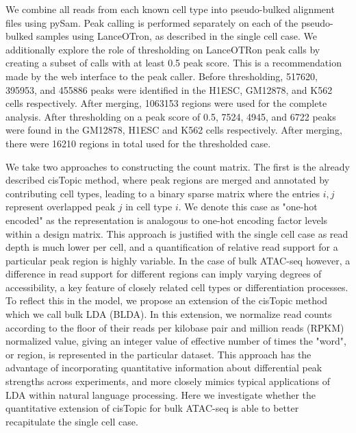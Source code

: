 We combine all reads from each known cell type into pseudo-bulked alignment files using pySam. Peak calling is performed separately on each of the pseudo-bulked samples using LanceOTron, as described in the single cell case. We additionally explore the role of thresholding on LanceOTRon peak calls by creating a subset of calls with at least 0.5 peak score. This is a recommendation made by the web interface to the peak caller. Before thresholding, 517620, 395953, and 455886 peaks were identified in the H1ESC, GM12878, and K562 cells respectively. After merging, 1063153 regions were used for the complete analysis. After thresholding on a peak score of 0.5, 7524, 4945, and 6722 peaks were found in the GM12878, H1ESC and K562 cells respectively. After merging, there were 16210 regions in total used for the thresholded case. 

We take two approaches to constructing the count matrix. The first is the already described cisTopic method, where peak regions are merged and annotated by contributing cell types, leading to a binary sparse matrix where the entries $i, j$ represent overlapped peak $j$ in cell type $i$. We denote this case as "one-hot encoded" as the representation is analogous to one-hot encoding factor levels within a design matrix. This approach is justified with the single cell case as read depth is much lower per cell, and a quantification of relative read support for a particular peak region is highly variable. In the case of bulk ATAC-seq however, a difference in read support for different regions can imply varying degrees of accessibility, a key feature of closely related cell types or differentiation processes.   To reflect this in the model, we propose an extension of the cisTopic method which we call bulk LDA (BLDA). In this extension, we normalize read counts according to the floor of their reads per kilobase pair and million reads (RPKM) normalized value, giving an integer value of effective number of times the "word", or region, is represented in the particular dataset. This approach has the advantage of incorporating quantitative information about differential peak strengths across experiments, and more closely mimics typical applications of LDA within natural language processing. Here we investigate whether the quantitative extension of cisTopic for bulk ATAC-seq is able to better recapitulate the single cell case.


